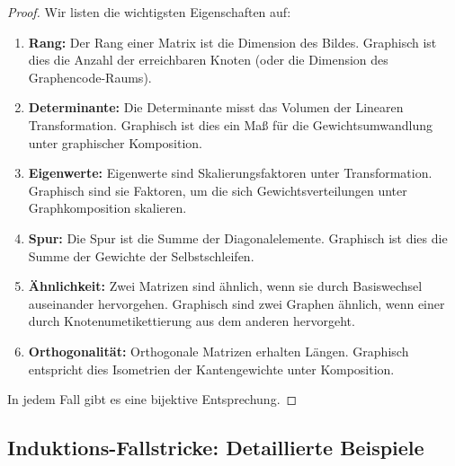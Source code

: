 \documentclass[12pt, a4paper]{article}
\theoremstyle{definition}
\theoremstyle{remark}
\begin{document}
\begin{proof}
Wir listen die wichtigsten Eigenschaften auf:

\begin{enumerate}[label=(\alph*)]
  \item \textbf{Rang:} Der Rang einer Matrix ist die Dimension des Bildes. Graphisch ist dies die Anzahl der erreichbaren Knoten (oder die Dimension des Graphencode-Raums).
  
  \item \textbf{Determinante:} Die Determinante misst das Volumen der Linearen Transformation. Graphisch ist dies ein Maß für die Gewichtsumwandlung unter graphischer Komposition.
  
  \item \textbf{Eigenwerte:} Eigenwerte sind Skalierungsfaktoren unter Transformation. Graphisch sind sie Faktoren, um die sich Gewichtsverteilungen unter Graphkomposition skalieren.
  
  \item \textbf{Spur:} Die Spur ist die Summe der Diagonalelemente. Graphisch ist dies die Summe der Gewichte der Selbstschleifen.
  
  \item \textbf{Ähnlichkeit:} Zwei Matrizen sind ähnlich, wenn sie durch Basiswechsel auseinander hervorgehen. Graphisch sind zwei Graphen ähnlich, wenn einer durch Knotenumetikettierung aus dem anderen hervorgeht.
  
  \item \textbf{Orthogonalität:} Orthogonale Matrizen erhalten Längen. Graphisch entspricht dies Isometrien der Kantengewichte unter Komposition.
\end{enumerate}

In jedem Fall gibt es eine bijektive Entsprechung.
\end{proof}

\subsection{Induktions-Fallstricke: Detaillierte Beispiele}
\label{subsec:anhang_induktion_fallstricke}
\end{document}
